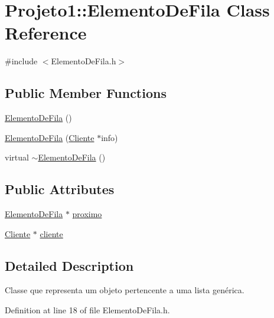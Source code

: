 \hypertarget{classProjeto1_1_1ElementoDeFila}{
\section{Projeto1::ElementoDeFila Class Reference}
\label{classProjeto1_1_1ElementoDeFila}
}


{\ttfamily \#include $<$ElementoDeFila.h$>$}

\subsection*{Public Member Functions}
\begin{DoxyCompactItemize}
\item 
\hyperlink{classProjeto1_1_1ElementoDeFila_a04c2a994dcd9c959645e1973edbdece1}{ElementoDeFila} ()
\item 
\hyperlink{classProjeto1_1_1ElementoDeFila_aade4aa1072f2467b3bfd4c6474c87faa}{ElementoDeFila} (\hyperlink{classProjeto1_1_1Cliente}{Cliente} $\ast$info)
\item 
virtual \hyperlink{classProjeto1_1_1ElementoDeFila_ab01575efe125553a2024453032654fd5}{$\sim$ElementoDeFila} ()
\end{DoxyCompactItemize}
\subsection*{Public Attributes}
\begin{DoxyCompactItemize}
\item 
\hyperlink{classProjeto1_1_1ElementoDeFila}{ElementoDeFila} $\ast$ \hyperlink{classProjeto1_1_1ElementoDeFila_a2ca3828f86b949959b03c3f0986434c8}{proximo}
\item 
\hyperlink{classProjeto1_1_1Cliente}{Cliente} $\ast$ \hyperlink{classProjeto1_1_1ElementoDeFila_a5a75508f83800ff9eded46dc6fdfc71f}{cliente}
\end{DoxyCompactItemize}


\subsection{Detailed Description}
Classe que representa um objeto pertencente a uma lista genérica. 

Definition at line 18 of file ElementoDeFila.h.



